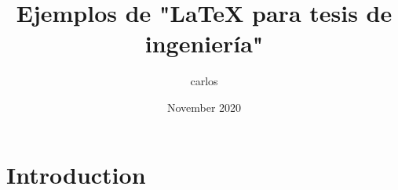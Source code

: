 \documentclass{article}
\title{Ejemplos de "LaTeX para tesis de ingeniería"}
\author{carlos }
\date{November 2020}
\begin{document}
\maketitle

\section{Introduction}
\end{document}
